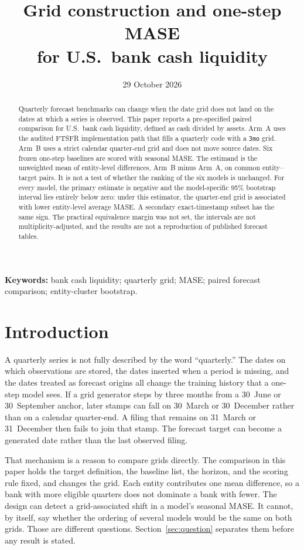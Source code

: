 \documentclass[11pt]{article}
\title{Grid construction and one-step MASE\\ for U.S.\ bank cash liquidity}
\author{\aq{author names and affiliations}}
\date{29 October 2026}
\newcommand{\armA}{Arm~A}
\newcommand{\armB}{Arm~B}
\begin{document}
\maketitle

\begin{abstract}
Quarterly forecast benchmarks can change when the date grid does not land on the dates at which a series is observed. This paper reports a pre-specified paired comparison for U.S.\ bank cash liquidity, defined as cash divided by assets. \armA{} uses the audited FTSFR implementation path that fills a quarterly code with a \texttt{3mo} grid. \armB{} uses a strict calendar quarter-end grid and does not move source dates. Six frozen one-step baselines are scored with seasonal MASE. The estimand is the unweighted mean of entity-level differences, \armB{} minus \armA{}, on common entity--target pairs. It is not a test of whether the ranking of the six models is unchanged. For every model, the primary estimate is negative and the model-specific 95\% bootstrap interval lies entirely below zero: under this estimator, the quarter-end grid is associated with lower entity-level average MASE. A secondary exact-timestamp subset has the same sign. The practical equivalence margin was not set, the intervals are not multiplicity-adjusted, and the results are not a reproduction of published forecast tables.
\end{abstract}

\noindent\textbf{Keywords:} bank cash liquidity; quarterly grid; MASE; paired forecast comparison; entity-cluster bootstrap.

\section{Introduction}
\label{sec:introduction}

A quarterly series is not fully described by the word ``quarterly.'' The dates on which observations are stored, the dates inserted when a period is missing, and the dates treated as forecast origins all change the training history that a one-step model sees. If a grid generator steps by three months from a 30~June or 30~September anchor, later stamps can fall on 30~March or 30~December rather than on a calendar quarter-end. A filing that remains on 31~March or 31~December then fails to join that stamp. The forecast target can become a generated date rather than the last observed filing.

That mechanism is a reason to compare grids directly. The comparison in this paper holds the target definition, the baseline list, the horizon, and the scoring rule fixed, and changes the grid. Each entity contributes one mean difference, so a bank with more eligible quarters does not dominate a bank with fewer. The design can detect a grid-associated shift in a model's seasonal MASE. It cannot, by itself, say whether the ordering of several models would be the same on both grids. Those are different questions. Section~\ref{sec:question} separates them before any result is stated.
\end{document}
